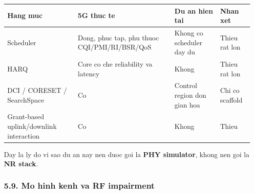 \documentclass[
  vietnamese,
  a4paper,
  11pt]{article}
\newcounter{none} %
\begin{document}
{\def\LTcaptype{none} %
\begin{longtable}[]{@{}
  >{\raggedright\arraybackslash}p{}
  >{\raggedright\arraybackslash}p{}
  >{\raggedright\arraybackslash}p{}
  >{\raggedright\arraybackslash}p{}@{}}
\toprule\noalign{}
\begin{minipage}[b]{\linewidth}\raggedright
Hang muc
\end{minipage} & \begin{minipage}[b]{\linewidth}\raggedright
5G thuc te
\end{minipage} & \begin{minipage}[b]{\linewidth}\raggedright
Du an hien tai
\end{minipage} & \begin{minipage}[b]{\linewidth}\raggedright
Nhan xet
\end{minipage} \\
\midrule\noalign{}
\endhead
\bottomrule\noalign{}
\endlastfoot
Scheduler & Dong, phuc tap, phu thuoc CQI/PMI/RI/BSR/QoS & Khong co
scheduler day du & Thieu rat lon \\
HARQ & Core co che reliability va latency & Khong & Thieu rat lon \\
DCI / CORESET / SearchSpace & Co & Control region don gian hoa & Chi co
scaffold \\
Grant-based uplink/downlink interaction & Co & Khong & Thieu \\
\end{longtable}
}

Day la ly do vi sao du an nay nen duoc goi la \textbf{PHY simulator},
khong nen goi la \textbf{NR stack}.

\subsubsection{5.9. Mo hinh kenh va RF
impairment}\label{mo-hinh-kenh-va-rf-impairment}
\end{document}
